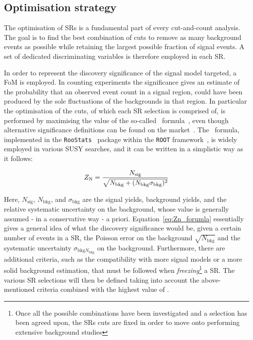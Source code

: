 		\subsection{Optimisation strategy}

			The optimisation of \acp{SR} is a fundamental part of every cut-and-count analysis. The goal is to find the best combination of cuts to remove as many background events as possible while retaining the largest possible fraction of signal events. A set of dedicated discriminating variables is therefore employed in each \ac{SR}.

			In order to represent the discovery significance of the signal model targeted, a \ac{FoM} is employed. In counting experiments the significance gives an estimate of the probability that an observed event count in a signal region, could have been produced by the sole fluctuations of the backgrounds in that region. In particular the optimisation of the cuts, of which each \ac{SR} selection is comprised of, is performed by maximising the value of the so-called \Zn\ formula~\cite{Zn}, even though alternative significance definitions can be found on the market~\cite{sigHEP}. The \Zn\ formula, implemented in the \verb+RooStats+~\cite{2010acat.confE..57M} package within the \verb+ROOT+ framework~\cite{Brun:1997pa}, is widely employed in various \ac{SUSY} searches, and it can be written in a simplistic way as it follows: 

			\begin{equation}
				Z_\mathrm{N} = \frac{N_\mathrm{sig}}{\sqrt{ N_\mathrm{bkg} + (N_\mathrm{bkg}\sigma_\mathrm{bkg})^2}}
				\label{eq:Zn_forumla}
			\end{equation} 

			\noindent Here, $N_\mathrm{sig}$, $N_\mathrm{bkg}$, and $\sigma_\mathrm{bkg}$ are the signal yields, background yields, and the relative systematic uncertainty on the background, whose value is generally assumed - in a conservative way - a priori. Equation~\ref{eq:Zn_forumla} essentially gives a general idea of what the discovery significance would be, given a certain number of events in a \ac{SR}, the Poisson error on the background $\sqrt{N_{\mathrm{bkg}}}$ and the systematic uncertainty $\sigma_{\mathrm{bkg}N_{\mathrm{bkg}}}$ on the background. Furthermore, there are additional criteria, such as the compatibility with more signal models or a more solid background estimation, that must be followed when \emph{freezing}\footnote{Once all the possible combinations have been investigated and a selection has been agreed upon, the \acp{SR} cuts are fixed in order to move onto performing extensive background studies} a \ac{SR}. The various \ac{SR} selections will then be defined taking into account the above-mentioned criteria combined with the highest value of \Zn. 

